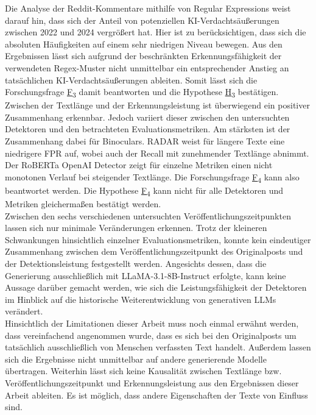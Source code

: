 Die Analyse der Reddit-Kommentare mithilfe von Regular Expressions weist darauf hin, dass sich der Anteil von potenziellen KI-Verdachtsäußerungen zwischen 2022 und 2024 vergrößert hat. Hier ist zu berücksichtigen, dass sich die absoluten Häufigkeiten auf einem sehr niedrigen Niveau bewegen. Aus den Ergebnissen lässt sich aufgrund der beschränkten Erkennungsfähigkeit der verwendeten Regex-Muster nicht unmittelbar ein entsprechender Anstieg an tatsächlichen KI-Verdachtsäußerungen ableiten. Somit lässt sich die Forschungsfrage \hyperlink{rq:3}{F\textsubscript{3}} damit beantworten und die Hypothese \hyperlink{hp:3}{H\textsubscript{3}} bestätigen. \\
Zwischen der Textlänge und der Erkennungsleistung ist überwiegend ein positiver Zusammenhang erkennbar. Jedoch variiert dieser zwischen den untersuchten Detektoren und den betrachteten Evaluationsmetriken. Am stärksten ist der Zusammenhang dabei für Binoculars. RADAR weist für längere Texte eine niedrigere FPR auf, wobei auch der Recall mit zunehmender Textlänge abnimmt. Der RoBERTa OpenAI Detector zeigt für einzelne Metriken einen nicht monotonen Verlauf bei steigender Textlänge. Die Forschungsfrage \hyperlink{rq:4}{F\textsubscript{4}} kann also beantwortet werden. Die Hypothese  \hyperlink{hp:4}{F\textsubscript{4}} kann nicht für alle Detektoren und Metriken gleichermaßen bestätigt werden. \\
Zwischen den sechs verschiedenen untersuchten Veröffentlichungszeitpunkten lassen sich nur minimale Veränderungen erkennen. Trotz der kleineren Schwankungen hinsichtlich einzelner Evaluationsmetriken, konnte kein eindeutiger Zusammenhang zwischen dem Veröffentlichungszeitpunkt des Originalposts und der Detektionsleistung festgestellt werden. Angesichts dessen, dass die Generierung ausschließlich mit  LLaMA-3.1-8B-Instruct erfolgte, kann keine Aussage darüber gemacht werden, wie sich die Leistungsfähigkeit der Detektoren im Hinblick auf die historische Weiterentwicklung von generativen LLMs verändert. \\
Hinsichtlich der Limitationen dieser Arbeit muss noch einmal erwähnt werden, dass vereinfachend angenommen wurde, dass es sich bei den Originalposts um tatsächlich ausschließlich von Menschen verfassten Text handelt. Außerdem lassen sich die Ergebnisse nicht unmittelbar auf andere generierende Modelle übertragen. Weiterhin lässt sich keine Kausalität zwischen Textlänge bzw. Veröffentlichungszeitpunkt und Erkennungsleistung aus den Ergebnissen dieser Arbeit ableiten. Es ist möglich, dass andere Eigenschaften der Texte von Einfluss sind. \\

